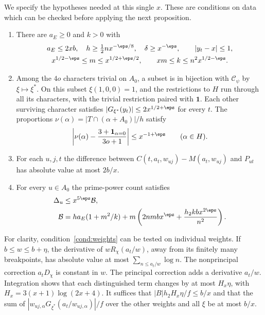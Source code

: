 \documentclass[a4paper,11pt]{article}
\theoremstyle{definition}
\theoremstyle{remark}
\numberwithin{equation}{section}
\begin{document}
We specify the hypotheses needed at this single \(x\). These are conditions on data which can be checked before applying the next proposition.
\begin{enumerate}
\item\label{cond:sizes} There are \(a_E\ge0\) and \(k>0\) with
\[
 \begin{gathered}
 a_E\le2xb,\quad h\ge\tfrac12n x^{-\eps/8},\quad \delta\ge x^{-\eps},
 \qquad |y_t-x|\le1,\\
 x^{1/2-\eps}\le m\le x^{1/2+\eps/2},\qquad
 xm\le k\le n^2x^{1/2-\eps}.
 \end{gathered}
\]
\item\label{cond:chars} Among the \(4o\) characters trivial on \(A_0\), a subset is in bijection with \(\mathcal C_\psi\) by \(\xi\mapsto\xi^*\). On this subset \(\xi(1,0,0)=1\), and the restrictions to \(H\) run through all its characters, with the trivial restriction paired with \(\mathbf1\). Each other surviving character satisfies \(|G_{\xi^*}(y_t)|\le 2x^{1/2+\eps}\) for every \(t\). The proportions \(\nu(\alpha)=|T\cap(\alpha+A_0)|/h\) satisfy
\[
 \left|\nu(\alpha)-\frac{3+\mathbf1_{\alpha=0}}{3o+1}\right|
                 \le x^{-1+\eps}\qquad (\alpha\in H).
\]
\item\label{cond:weights} For each \(u,j,t\) the difference between \(C(t,a_t,w_{uj})-M(a_t,w_{uj})\) and \(P_{ut}\) has absolute value at most \(2b/x\).
\item\label{cond:gap} For every \(u\in A_0\) the prime-power count satisfies
\begin{align}
  \Delta_u &\le x^{5\eps}\mathcal B,                                      \label{eq:gap}\\
  \mathcal B&=h a_E(1+m^2/k)
        +m\left(2nmbx^\eps+\frac{h_2 k b x^{2\eps}}{n^2}\right).           \notag
\end{align}
\end{enumerate}
For clarity, condition~\ref{cond:weights} can be tested on individual weights. If \(b\le w\le b+\eta\), the derivative of \(wR_\chi(a_t/w)\), away from its finitely many breakpoints, has absolute value at most \(\sum_{n\le a_t/w}\log n\). The nonprincipal correction \(a_tD_\chi\) is constant in \(w\). The principal correction adds a derivative \(a_t/w\). Integration shows that each distinguished term changes by at most \(H_x\eta\), with \(H_x=3(x+1)\log(2x+4)\). It suffices that \(|B|h_2H_x\eta/f\le b/x\) and that the sum of \(|w_{uj,\alpha}G_{\xi^*}(a_t/w_{uj,\alpha})|/f\) over the other weights and all \(\xi\) be at most \(b/x\).
\end{document}
